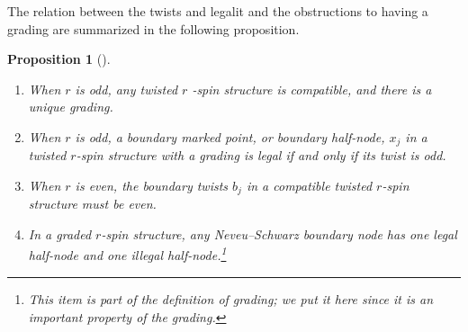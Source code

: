 \documentclass[11pt]{amsart}
\newtheorem{prop}[dummy]{Proposition}
\theoremstyle{definition}
\theoremstyle{remark}
\newcommand{\<}{\left<}
\renewcommand{\>}{\right>}
\numberwithin{equation}{section}
\begin{document}
The relation between the twists %
and legalit and %
the obstructions to having %
a grading are %
summarized in the following %
proposition.
\begin{prop}[{\cite[Proposition 2.3]{BCT2}}] 
\label{prop lifting}
\begin{enumerate}
\item\label{it lift odd exist} When $r$ is odd, any twisted $r$%
-spin structure is compatible, and there is a unique %
grading.
\item\label{it lift odd legal} When $r$ is odd, a boundary marked point, or boundary half-node, $x_j$ in %
a twisted $r$-spin structure with a grading is legal if and only if its twist is %
odd.
\item\label{it lift even compatible} When $r$ is even, the boundary twists $b_j$ in a compatible twisted $r$-spin structure %
must be %
even.  

\item\label{it NS nodes}
In a graded $r$-spin structure, any Neveu--Schwarz boundary node has one %
legal half-node and one %
illegal half-node.\footnote{This item is part of the definition of grading; we put it here since it is an important property of the grading.}


\end{enumerate}
\end{prop}
\end{document}
